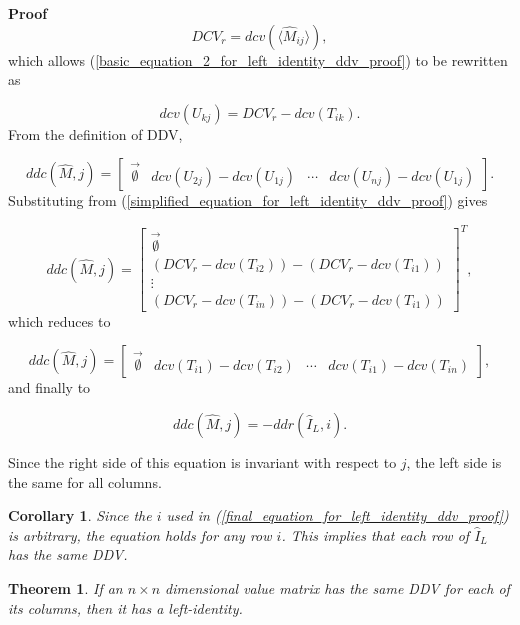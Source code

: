 \documentclass[10pt,letterpaper]{article}
\newtheorem{thm}{Theorem}[section]
\newtheorem{cor}{Corollary}[section]
\newenvironment{proof}{\noindent\textbf{Proof} }{\qed \newline}
\newcommand{\qed}{\nobreak \ifvmode \relax \else
      \ifdim\lastskip<1.5em \hskip-\lastskip
      \hskip1.5em plus0em minus0.5em \fi \nobreak
      \vrule height0.75em width0.5em depth0.25em\fi}
\numberwithin{equation}{section}
\begin{document}
\begin{proof}
\[ DCV_r = dcv( \langle \hat M_{ij} \rangle ) , \] which allows
(\ref{basic_equation_2_for_left_identity_ddv_proof}) to be rewritten
as

\begin{equation} \label{simplified_equation_for_left_identity_ddv_proof}
  dcv(U_{kj}) = DCV_r - dcv(T_{ik}) . \end{equation} From the
definition of DDV,

\[ ddc(\hat M, j) = \left[ \begin{matrix} \vec{\emptyset} &
    dcv(U_{2j}) - dcv(U_{1j}) & \cdots & dcv(U_{nj}) -
    dcv(U_{1j}) \end{matrix} \right] . \] Substituting from
(\ref{simplified_equation_for_left_identity_ddv_proof}) gives

\[ ddc(\hat M, j) = \left[ \begin{matrix} \vec{\emptyset} \\ (DCV_r -
    dcv(T_{i2})) - (DCV_r - dcv(T_{i1})) \\ \vdots \\ (DCV_r -
    dcv(T_{in})) - (DCV_r - dcv(T_{i1})) \end{matrix} \right] ^T , \]
which reduces to

\[ ddc(\hat M, j) = \left[ \begin{matrix} \vec{\emptyset} &
    dcv(T_{i1}) - dcv(T_{i2}) & \cdots & dcv(T_{i1}) -
    dcv(T_{in}) \end{matrix} \right] , \] and finally to

\begin{equation} \label{final_equation_for_left_identity_ddv_proof}
  ddc(\hat M, j) = -ddr(\hat I_L, i) . \end{equation}

Since the right side of this equation is invariant with respect to
$j$, the left side is the same for all columns. \end{proof}

\begin{cor}Since the $i$ used in
  (\ref{final_equation_for_left_identity_ddv_proof}) is arbitrary, the
  equation holds for any row $i$.  This implies that each row of $\hat
  I_L$ has the same DDV.\end{cor}

\begin{thm} \label{if_same_col_ddvs_then_IL} If an $n \times n$
  dimensional value matrix has the same DDV for each of its columns,
  then it has a left-identity.\end{thm}
\end{document}
